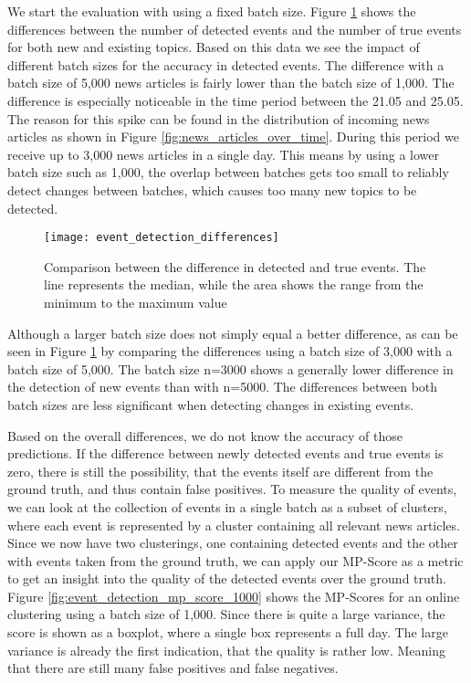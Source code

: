 We start the evaluation with using a fixed batch size.
Figure \ref{fig:event_detection_differences} shows the differences between the number of detected events
and the number of true events for both new and existing topics.
Based on this data we see the impact of different batch sizes for the accuracy in detected events.
The difference with a batch size of 5,000 news articles is fairly lower than the batch size of 1,000.
The difference is especially noticeable in the time period between the 21.05 and 25.05.
The reason for this spike can be found in the distribution of incoming news articles
as shown in Figure \ref{fig:news_articles_over_time}.
During this period we receive up to 3,000 news articles in a single day.
This means by using a lower batch size such as 1,000,
the overlap between batches gets too small to reliably detect changes between batches,
which causes too many new topics to be detected.

\begin{figure}[h]
    \centering
    \texttt{[image: event\_detection\_differences]}
    \caption{Comparison between the difference in detected and true events. The line represents the median, while the area shows the range from the minimum to the maximum value}
    \label{fig:event_detection_differences}
\end{figure}

Although a larger batch size does not simply equal a better difference,
as can be seen in Figure \ref{fig:event_detection_differences}
by comparing the differences using a batch size of 3,000 with a batch size of 5,000.
The batch size n=3000 shows a generally lower difference in the detection of new events than with n=5000.
The differences between both batch sizes are less significant when detecting changes in existing events.

Based on the overall differences, we do not know the accuracy of those predictions. 
If the difference between newly detected events and true events is zero,
there is still the possibility, that the events itself are different from the ground truth,
and thus contain false positives.
To measure the quality of events, we can look at the collection of events in a single batch as a subset of clusters,
where each event is represented by a cluster containing all relevant news articles.
Since we now have two clusterings, one containing detected events and the other with events taken from the ground truth,
we can apply our MP-Score as a metric to get an insight into the quality of the detected events over the ground truth.
Figure \ref{fig:event_detection_mp_score_1000} shows the MP-Scores for an online clustering using a batch size of 1,000.
Since there is quite a large variance, the score is shown as a boxplot, where a single box represents a full day.
The large variance is already the first indication, that the quality is rather low.
Meaning that there are still many false positives and false negatives.

